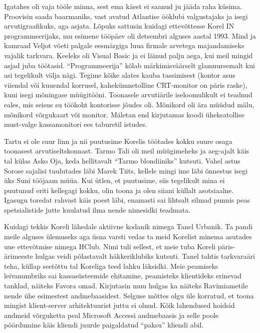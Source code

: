 Igatahes oli vaja tööle minna, sest ema käest ei saanud ju jääda raha küsima. Proovisin saada baarmaniks, vast avatud Atlantise ööklubi valgustajaks ja isegi arvutigraafikuks, aga asjata. Lõpuks sattusin kuidagi ettevõttesse Korel IN programmeerijaks, mu esimene tööpäev oli detsembri alguses aastal 1993. Mind ja kamraad Veljot võeti palgale eesmärgiga luua firmale arvetega majandamiseks vajalik tarkvara. Keeleks oli Visual Basic ja ei läinud palju aega, kui meil mingid asjad juba töötasid. \enquote{Programmeerija} kõlab märkimisväärselt glamuursemalt kui asi tegelikult välja nägi. Tegime kõike alates kauba tassimisest (kontor asus viiendal või kuuendal korrusel, kahekümnetolline CRT-monitor on päris raske), kuni isegi mõningase müügitööni. Toonasele arvutiärile iseloomulikult ei teadnud eales, mis seisus su töökoht kontorisse jõudes oli. Mõnikord oli ära müüdud mälu, mõnikord võrgukaart või monitor. Mäletan end kirjutamas koodi üheksatollise must-valge kassamonitori ees taburetil istudes. 

Tartu ei ole suur linn ja nii puutusime Korelis töötades kokku suure osaga toonasest arvutiseltskonnast. Tarmo Tali oli meil müügimeheks ja aeg-ajalt käis tal külas Asko Oja, keda hellitavalt \enquote{Tarmo blondiiniks} kutsuti. Vahel astus Sorose sajalisi tuulutades läbi Marek Tiits, kellele mingi ime läbi õnnestus isegi üks Suni tööjaam müüa. Kui ütlen, et puutusime, siis tegelikult mina ei puutunud eriti kellegagi kokku, olin toona ja olen siiani küllalt asotsiaalne. Igasugu toredat rahvast käis poest läbi, enamasti sai lihtsalt silmad punnis peas spetsialistide jutte kuulatud ilma nende nimesidki teadmata. 

Kuidagi tekkis Koreli lähedale aktiivne kodanik nimega Tanel Urbanik. Ta pandi meile alguses ülemuseks aga üsna varsti vedas ta meid Korelist minema asutades uue ettevõtmise nimega HClub. Nimi tuli sellest, et meie tuba Koreli päris-ärimeeste hulgas veidi põlastavalt häkkeriklubiks kutsuti. Tanel tahtis tarkvaraäri teha, küllap seetõttu tal Koreliga teed lahku läksidki. Meie peamiseks leivanumbriks sai kassasüsteemide ehitamine, peamisteks klientideks erinevad tanklad, näiteks Favora omad. Kirjutasin muu hulgas ka näiteks Ravimiametile nende ühe esimestest andmebaasidest. Selguse mõttes olgu üle korratud, et toona mingist klient-server arhitektuurist juttu ei olnud. Kõik lahendused hoidsid andmeid võrguketta peal Microsoft Accessi andmebaasis ja selle poole pöördumine käis kliendi juurde paigaldatud \enquote{paksu} kliendi abil. 


